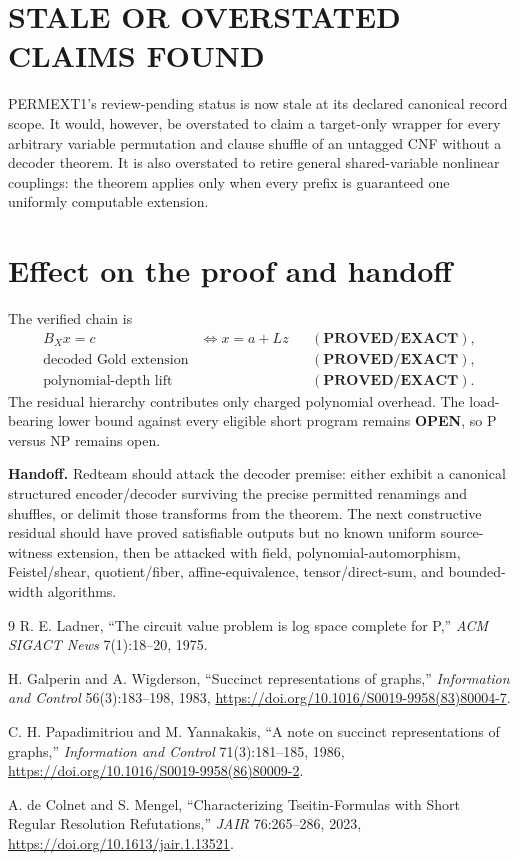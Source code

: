 \documentclass[11pt]{article}
\newcommand{\EXACT}{\textbf{PROVED/EXACT}}
\newcommand{\OPEN}{\textbf{OPEN}}
\begin{document}
\section{STALE OR OVERSTATED CLAIMS FOUND}
PERMEXT1's review-pending status is now stale at its declared canonical
record scope.  It would, however, be overstated to claim a target-only wrapper
for every arbitrary variable permutation and clause shuffle of an untagged
CNF without a decoder theorem.  It is also overstated to retire general
shared-variable nonlinear couplings: the theorem applies only when every
prefix is guaranteed one uniformly computable extension.

\section{Effect on the proof and handoff}
The verified chain is
\[
\begin{aligned}
B_Xx=c&\Longleftrightarrow x=a+Lz &&(\EXACT),\\
\text{decoded Gold extension}&&&(\EXACT),\\
\text{polynomial-depth lift}&&&(\EXACT).
\end{aligned}
\]
The residual hierarchy contributes only charged polynomial overhead.  The
load-bearing lower bound against every eligible short program remains
\OPEN{}, so P versus NP remains open.

\textbf{Handoff.}  Redteam should attack the decoder premise: either exhibit
a canonical structured encoder/decoder surviving the precise permitted
renamings and shuffles, or delimit those transforms from the theorem.  The
next constructive residual should have proved satisfiable outputs but no
known uniform source-witness extension, then be attacked with field,
polynomial-automorphism, Feistel/shear, quotient/fiber, affine-equivalence,
tensor/direct-sum, and bounded-width algorithms.

\begin{thebibliography}{9}
R. E. Ladner, ``The circuit value problem is log space complete for P,''
\emph{ACM SIGACT News} 7(1):18--20, 1975.

H. Galperin and A. Wigderson, ``Succinct representations of graphs,''
\emph{Information and Control} 56(3):183--198, 1983,
\url{https://doi.org/10.1016/S0019-9958(83)80004-7}.

C. H. Papadimitriou and M. Yannakakis,
``A note on succinct representations of graphs,''
\emph{Information and Control} 71(3):181--185, 1986,
\url{https://doi.org/10.1016/S0019-9958(86)80009-2}.

A. de Colnet and S. Mengel,
``Characterizing Tseitin-Formulas with Short Regular Resolution
Refutations,'' \emph{JAIR} 76:265--286, 2023,
\url{https://doi.org/10.1613/jair.1.13521}.
\end{thebibliography}
\end{document}
